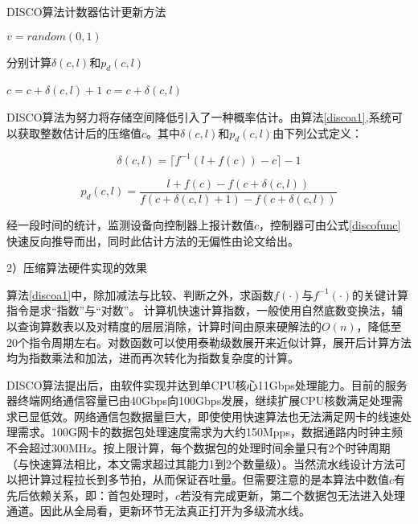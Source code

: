 \begin{algorithm}[ht]
	\caption{DISCO算法计数器估计更新方法 \label{discoa1}}
	\IncMargin{2em}
	\DontPrintSemicolon
	$ v = random(0,1) $
	
	分别计算$ \delta(c,l) $和$ p_d(c,l) $
	

	{$ c = c + \delta(c,l) +1 $ }
	{$ c = c + \delta(c,l) $ }
\end{algorithm}

DISCO算法为努力将存储空间降低引入了一种概率估计。由算法\ref{discoa1},系统可以获取整数估计后的压缩值$c$。其中$ \delta(c,l) $和$ p_d(c,l) $由下列公式定义：

\begin{equation} \label{discofun2}
\delta(c,l)=\lceil f^{-1}(l+f(c)) - c \rceil - 1
\end{equation}

\begin{equation} \label{discofun3}
p_d(c,l) = \dfrac{l+f(c)-f(c+\delta(c,l))}{f(c+\delta(c,l)+1)-f(c+\delta(c,l))}
\end{equation}

经一段时间的统计，监测设备向控制器上报计数值$ c $，控制器可由公式\ref{discofunc}快速反向推导而出，同时此估计方法的无偏性由论文给出。


2）压缩算法硬件实现的效果

算法\ref{discoa1}中，除加减法与比较、判断之外，求函数$ f(\cdot)$与$ f^{-1}(\cdot) $的关键计算指令是求“指数”与“对数”。 计算机快速计算指数，一般使用自然底数变换法，辅以查询算数表以及对精度的层层消除，计算时间由原来硬解法的$ O(n) $，降低至20个指令周期左右。对数函数可以使用泰勒级数展开来近似计算，展开后计算方法均为指数乘法和加法，进而再次转化为指数复杂度的计算。

DISCO算法提出后，由软件实现并达到单CPU核心11Gbps处理能力。目前的服务器终端网络通信容量已由40Gbps向100Gbps发展，继续扩展CPU核数满足处理需求已显低效。网络通信包数据量巨大，即使使用快速算法也无法满足网卡的线速处理需求。100G网卡的数据包处理速度需求为大约150Mpps，数据通路内时钟主频不会超过300MHz。按上限计算，每个数据包的处理时间余量只有2个时钟周期（与快速算法相比，本文需求超过其能力1到2个数量级）。当然流水线设计方法可以把计算过程拉长到多节拍，从而保证吞吐量。但需要注意的是本算法中数值$ c $有先后依赖关系，即：首包处理时，$ c $若没有完成更新，第二个数据包无法进入处理通道。因此从全局看，更新环节无法真正打开为多级流水线。

